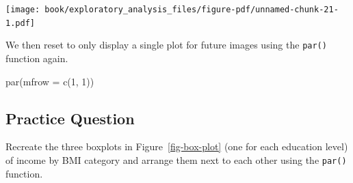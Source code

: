 \documentclass[
  letterpaper,
]{latex/krantz}
\makeatletter
\newenvironment{Shaded}{\begin{snugshade}}{\end{snugshade}}
\newcommand{\AttributeTok}[1]{\textcolor[rgb]{0.40,0.45,0.13}{#1}}
\newcommand{\CommentTok}[1]{\textcolor[rgb]{0.37,0.37,0.37}{#1}}
\newcommand{\DecValTok}[1]{\textcolor[rgb]{0.68,0.00,0.00}{#1}}
\newcommand{\FunctionTok}[1]{\textcolor[rgb]{0.28,0.35,0.67}{#1}}
\newcommand{\NormalTok}[1]{\textcolor[rgb]{0.00,0.23,0.31}{#1}}
\newcommand{\SpecialCharTok}[1]{\textcolor[rgb]{0.37,0.37,0.37}{#1}}
\newcommand{\StringTok}[1]{\textcolor[rgb]{0.13,0.47,0.30}{#1}}
\newenvironment{kframe}{%
\medskip{}
\setlength{\fboxsep}{.8em}
 \def\at@end@of@kframe{}%
 \ifinner\ifhmode%
  \def\at@end@of@kframe{\end{minipage}}%
  \begin{minipage}{\columnwidth}%
 \fi\fi%
 \def\FrameCommand##1{\hskip\@totalleftmargin \hskip-\fboxsep
 \colorbox{shadecolor}{##1}\hskip-\fboxsep
     \hskip-\linewidth \hskip-\@totalleftmargin \hskip\columnwidth}%
 \MakeFramed {\advance\hsize-\width
   \@totalleftmargin\z@ \linewidth\hsize
   \@setminipage}}%
 {\par\unskip\endMakeFramed%
 \at@end@of@kframe}
\renewenvironment{Shaded}{\begin{kframe}}{\end{kframe}}
\makeatother
\begin{document}
\begin{Shaded}
\end{Shaded}

\begin{center}
\texttt{[image: book/exploratory\_analysis\_files/figure-pdf/unnamed-chunk-21-1.pdf]}
\end{center}

We then reset to only display a single plot for future images using the
\texttt{par()} function again.

\begin{Shaded}
\begin{Highlighting}[]
\FunctionTok{par}\NormalTok{(}\AttributeTok{mfrow =} \FunctionTok{c}\NormalTok{(}\DecValTok{1}\NormalTok{, }\DecValTok{1}\NormalTok{))}
\end{Highlighting}
\end{Shaded}

\subsection{Practice Question}\label{practice-question-7}

Recreate the three boxplots in Figure~\ref{fig-box-plot} (one for each
education level) of income by BMI category and arrange them next to each
other using the \texttt{par()} function.
\end{document}
